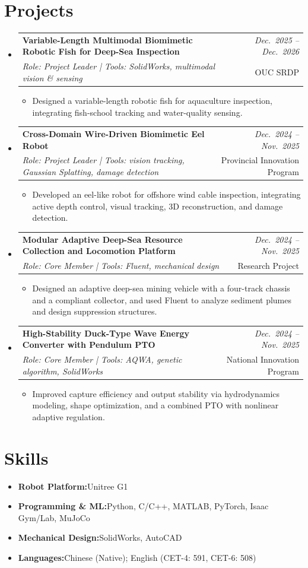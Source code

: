 \documentclass[a4paper,11pt]{article}
\makeatletter
\newcommand{\resumeItem}[2]{
  \item{
    \textbf{#1}{\hspace{0.5mm}#2 \vspace{-0.5mm}}
  }
}
\newcommand{\resumeProject}[4]{
\vspace{0.5mm}\item
    \begin{tabular*}{0.98\textwidth}[t]{l@{\extracolsep{\fill}}r}
        \textbf{#1} & \textit{\footnotesize{#3}} \\
        \footnotesize{\textit{#2}} & \footnotesize{#4}
    \end{tabular*}
    \vspace{-2.4mm}
}
\newcommand{\resumeSubItem}[2]{\resumeItem{#1}{#2}\vspace{-4pt}}
\newcommand{\resumeSubHeadingListStart}{\begin{itemize}[leftmargin=*,labelsep=1mm]}
\newcommand{\resumeHeadingSkillStart}{\begin{itemize}[leftmargin=*,itemsep=1.7mm, rightmargin=2ex]}
\newcommand{\resumeItemListStart}{\begin{itemize}[leftmargin=*,labelsep=1mm,itemsep=0.5mm,label={$\vcenter{\hbox{\tiny$\circ$}}$}]}
\newcommand{\resumeSubHeadingListEnd}{\end{itemize}\vspace{2mm}}
\newcommand{\resumeHeadingSkillEnd}{\end{itemize}\vspace{-2mm}}
\newcommand{\resumeItemListEnd}{\end{itemize}\vspace{-2mm}}
\makeatother
\begin{document}
\section{\textbf{Projects}}
\vspace{-0.4mm}
\resumeSubHeadingListStart

\resumeProject
  {Variable-Length Multimodal Biomimetic Robotic Fish for Deep-Sea Inspection}
  {Role: Project Leader \;|\; Tools: SolidWorks, multimodal vision \& sensing}
  {Dec.\ 2025 -- Dec.\ 2026}
  {OUC SRDP}
\resumeItemListStart
  \item Designed a variable-length robotic fish for aquaculture inspection, integrating fish-school tracking and water-quality sensing.
\resumeItemListEnd

\resumeProject
  {Cross-Domain Wire-Driven Biomimetic Eel Robot}
  {Role: Project Leader \;|\; Tools: vision tracking, Gaussian Splatting, damage detection}
  {Dec.\ 2024 -- Nov.\ 2025}
  {Provincial Innovation Program}
\resumeItemListStart
  \item Developed an eel-like robot for offshore wind cable inspection, integrating active depth control, visual tracking, 3D reconstruction, and damage detection.
\resumeItemListEnd

\resumeProject
  {Modular Adaptive Deep-Sea Resource Collection and Locomotion Platform}
  {Role: Core Member \;|\; Tools: Fluent, mechanical design}
  {Dec.\ 2024 -- Nov.\ 2025}
  {Research Project}
\resumeItemListStart
  \item Designed an adaptive deep-sea mining vehicle with a four-track chassis and a compliant collector, and used Fluent to analyze sediment plumes and design suppression structures.
\resumeItemListEnd

\resumeProject
  {High-Stability Duck-Type Wave Energy Converter with Pendulum PTO}
  {Role: Core Member \;|\; Tools: AQWA, genetic algorithm, SolidWorks}
  {Dec.\ 2024 -- Nov.\ 2025}
  {National Innovation Program}
\resumeItemListStart
  \item Improved capture efficiency and output stability via hydrodynamics modeling, shape optimization, and a combined PTO with nonlinear adaptive regulation.
\resumeItemListEnd

\resumeSubHeadingListEnd

\section{\textbf{Skills}}
\vspace{-0.4mm}
\resumeHeadingSkillStart
  \resumeSubItem{Robot Platform:}
    {Unitree G1}
  \resumeSubItem{Programming \& ML:}
    {Python, C/C++, MATLAB, PyTorch, Isaac Gym/Lab, MuJoCo}
  \resumeSubItem{Mechanical Design:}
    {SolidWorks, AutoCAD}
  \resumeSubItem{Languages:}
    {Chinese (Native); English (CET-4: 591, CET-6: 508)}
\resumeHeadingSkillEnd
\end{document}
